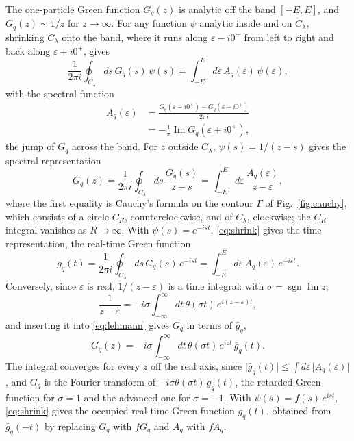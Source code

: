 \documentclass[aps,prb,reprint,a4paper]{revtex4-2}
\DeclareMathOperator{\Imag}{Im}
\begin{document}
The one-particle Green function $G_q(z)$ is analytic off the band $[-E,E]$, and $G_q(z)\sim1/z$ for $z\to\infty$. For any function $\psi$ analytic inside and on $C_\lambda$, shrinking $C_\lambda$ onto the band, where it runs along $\varepsilon-i0^+$ from left to right and back along $\varepsilon+i0^+$, gives
\begin{equation}
  \frac1{2\pi i}\oint_{C_\lambda}ds\,G_q(s)\,\psi(s)=\int_{-E}^{E}d\varepsilon\,A_q(\varepsilon)\,\psi(\varepsilon),
  \label{eq:shrink}
\end{equation}
with the spectral function
\begin{equation}
  \begin{aligned}
  A_q(\varepsilon)&=\frac{G_q(\varepsilon-i0^+)-G_q(\varepsilon+i0^+)}{2\pi i}\\
  &=-\frac1\pi\Imag G_q(\varepsilon+i0^+),
  \end{aligned}
  \label{eq:specfn}
\end{equation}
the jump of $G_q$ across the band. For $z$ outside $C_\lambda$, $\psi(s)=1/(z-s)$ gives the spectral representation
\begin{equation}
  G_q(z)=\frac1{2\pi i}\oint_{C_\lambda}ds\,\frac{G_q(s)}{z-s}=\int_{-E}^{E}d\varepsilon\,\frac{A_q(\varepsilon)}{z-\varepsilon},
  \label{eq:lehmann}
\end{equation}
where the first equality is Cauchy's formula on the contour $\Gamma$ of Fig.~\ref{fig:cauchy}, which consists of a circle $C_R$, counterclockwise, and of $C_\lambda$, clockwise; the $C_R$ integral vanishes as $R\to\infty$. With $\psi(s)=e^{-ist}$, \eqref{eq:shrink} gives the time representation, the real-time Green function
\begin{equation}
  \bar g_q(t)=\frac1{2\pi i}\oint_{C_\lambda}ds\,G_q(s)\,e^{-ist}=\int_{-E}^{E}d\varepsilon\,A_q(\varepsilon)\,e^{-i\varepsilon t}.
  \label{eq:gbar}
\end{equation}
Conversely, since $\varepsilon$ is real, $1/(z-\varepsilon)$ is a time integral: with $\sigma=\operatorname{sgn}\Imag z$,
\begin{equation}
  \frac1{z-\varepsilon}=-i\sigma\int_{-\infty}^{\infty}dt\,\theta(\sigma t)\,e^{i(z-\varepsilon)t},
  \label{eq:laplace_z}
\end{equation}
and inserting it into \eqref{eq:lehmann} gives $G_q$ in terms of $\bar g_q$,
\begin{equation}
  G_q(z)=-i\sigma\int_{-\infty}^{\infty}dt\,\theta(\sigma t)\,e^{izt}\,\bar g_q(t).
  \label{eq:ginv}
\end{equation}
The integral converges for every $z$ off the real axis, since $\lvert\bar g_q(t)\rvert\le\int d\varepsilon\,\lvert A_q(\varepsilon)\rvert$, and $G_q$ is the Fourier transform of $-i\sigma\theta(\sigma t)\,\bar g_q(t)$, the retarded Green function for $\sigma=1$ and the advanced one for $\sigma=-1$. With $\psi(s)=f(s)\,e^{ist}$, \eqref{eq:shrink} gives the occupied real-time Green function $g_q(t)$, obtained from $\bar g_q(-t)$ by replacing $G_q$ with $fG_q$ and $A_q$ with $fA_q$.
\end{document}

